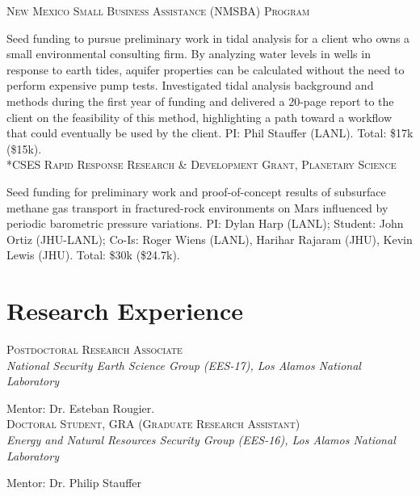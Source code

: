 \documentclass[11pt, letterpaper]{article}
\newcommand{\years}[1]{\marginnote{\scriptsize #1}}
\begin{document}
\years{2020}\textsc{New Mexico Small Business Assistance (NMSBA) Program}

	Seed funding to pursue preliminary work in tidal analysis for a client who
	owns a small environmental consulting firm. By analyzing water levels in
	wells in response to earth tides, aquifer properties can be calculated
	without the need to perform expensive pump tests.  Investigated tidal
	analysis background and methods during the first year of funding and
	delivered a 20-page report to the client on the feasibility of this method,
	highlighting a path toward a workflow that could eventually be used by the
	client.   
	PI: Phil Stauffer (LANL). Total: \$17k (\$15k). \\

\years{2020}\textsc{*CSES Rapid Response Research \& Development Grant, Planetary
Science}

	Seed funding for preliminary work and proof-of-concept results of
	subsurface methane gas transport in fractured-rock environments on Mars
	influenced by periodic barometric pressure variations.
    PI: Dylan Harp (LANL); Student: John Ortiz (JHU-LANL); Co-Is: Roger Wiens
    (LANL), Harihar Rajaram (JHU), Kevin Lewis (JHU). Total: \$30k (\$24.7k).


\section*{Research Experience}
\setlength{\parindent}{14pt}
\years{2024 - pres.}\textsc{Postdoctoral Research Associate}\\
\textit{National Security Earth Science Group (EES-17), Los Alamos National Laboratory}

    \vspace{3pt} \noindent  
    Mentor: Dr. Esteban Rougier.  \\

\noindent
\years{2020 - 2024}\textsc{Doctoral Student, GRA (Graduate Research Assistant)}\\
\textit{Energy and Natural Resources Security Group (EES-16), Los Alamos National Laboratory}

    \vspace{3pt} \noindent  
    Mentor: Dr. Philip Stauffer 
\end{document}
